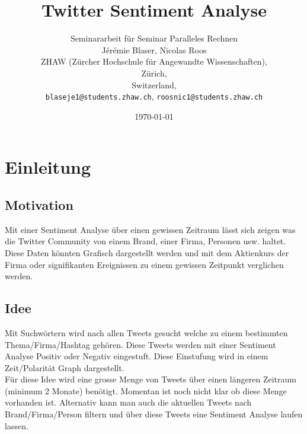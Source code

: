 \documentclass[12pt, oneside]{report}   	%
\title{Twitter Sentiment Analyse}
\author{Seminararbeit für Seminar Paralleles Rechnen\\
	Jérémie Blaser, Nicolas Roos\\
	ZHAW (Zürcher Hochschule für Angewandte Wissenschaften),\\
	Zürich,\\
	Switzerland,\\
	\texttt{blaseje1@students.zhaw.ch},
	\texttt{roosnic1@students.zhaw.ch}}
\date{\today}							%
\begin{document}
\lstset{language=Python} 
\newcommand{\qem}[1]{\emph{"<#1">}} %

\maketitle




\tableofcontents

\chapter{Einleitung}
\section{Motivation}
Mit einer Sentiment Analyse über einen gewissen Zeitraum lässt sich zeigen was die Twitter Community von einem Brand, einer Firma, Personen usw. haltet. Diese Daten könnten Grafisch dargestellt werden und mit dem Aktienkurs der Firma oder signifikanten Ereignissen zu einem gewissen Zeitpunkt verglichen werden. 
\section{Idee}
Mit Suchwörtern wird nach allen Tweets gesucht welche zu einem bestimmten Thema/Firma/Hashtag gehören. Diese Tweets werden mit einer Sentiment Analyse Positiv oder Negativ eingestuft. Diese Einstufung wird in einem Zeit/Polarität Graph dargestellt. \\
Für diese Idee wird eine grosse Menge von Tweets über einen längeren Zeitraum (minimum 2 Monate) benötigt. Momentan ist noch nicht klar ob diese Menge vorhanden ist. Alternativ kann man auch die aktuellen Tweets nach Brand/Firma/Person filtern und über diese Tweets eine Sentiment Analyse laufen lassen.
\end{document}
